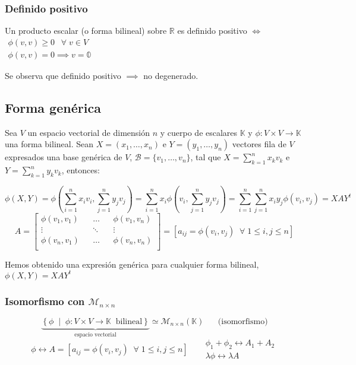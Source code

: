 \documentclass{preset}
\begin{document}
\vspace{-25pt}
\subsubsection{Definido positivo}
Un producto escalar (o forma bilineal) sobre $\mathbb{R}$ es definido positivo $\iff$ $\begin{matrix}
\phi(v,v)\geq 0 \ \;\; \forall \; v \in V\\
\phi(v,v)=0 \implies v=\mathbb{0}
\end{matrix}$


Se observa que definido positivo $\implies$ no degenerado.

\vspace{-15pt}
\subsection{Forma genérica}
Sea $V$ un espacio vectorial de dimensión $n$ y cuerpo de escalares $\mathbb{K}$ y $\phi: V \times V \rightarrow \mathbb{K}$ una forma bilineal. Sean $X=(x_1,\dots,x_n)$ e $Y=(y_1,\dots,y_n)$ vectores fila de $V$ expresados una base genérica de $V$, $\mathcal{B}=\{v_1,\dots,v_n\}$, tal que $X=\sum_{k=1}^{n}{x_k v_k}$ e $Y=\sum_{k=1}^{n}{y_k v_k}$, entonces:

\vspace{-15pt}
\[ \phi(X,Y)=\phi\left(\sum_{i=1}^{n}{x_i v_i},\sum_{j=1}^{n}{y_j v_j}\right)=\sum_{i=1}^{n}{x_i \phi\left( v_i, \sum_{j=1}^{n}{y_j v_j} \right)} = \sum_{i=1}^{n}{\sum_{j=1}^{n}{x_i y_j \phi\left( v_i, v_j \right)}}= X A Y^t\]
\vspace{-10pt}
\[A=\left[\begin{matrix}
\phi(v_1,v_1) && \dots && \phi(v_1,v_n) \\
\vdots && \ddots && \vdots\\
\phi(v_n,v_1) && \dots && \phi(v_n,v_n) \\
\end{matrix}\right] = [a_{ij} = \phi(v_i,v_j) \;\; \forall \; 1 \leq i,j \leq n] \]

Hemos obtenido una expresión genérica para cualquier forma bilineal, $\phi(X,Y)=XAY^t$

\vspace{-25pt}
\subsubsection{Isomorfismo con $\mathcal{M}_{n \times n}$}
\[ \underbrace{\left\{ \phi \;\; \vert \;\; \phi: V \times V \rightarrow \mathbb{K} \;\; \mbox{bilineal} \right\}}_{\mbox{espacio vectorial}}  \simeq \mathcal{M}_{n \times n} (\mathbb{K}) \;\;\;\;\;\; \mbox{(isomorfismo)}\]
\vspace{-10pt}
\[\phi \leftrightarrow A=[a_{ij} = \phi(v_i,v_j) \;\; \forall \; 1 \leq i,j \leq n] \;\;\;  \;\;\;
\begin{matrix}
\phi_1+\phi_2 \leftrightarrow A_1 + A_2\\
\lambda\phi \leftrightarrow \lambda A
\end{matrix} \]
\end{document}
